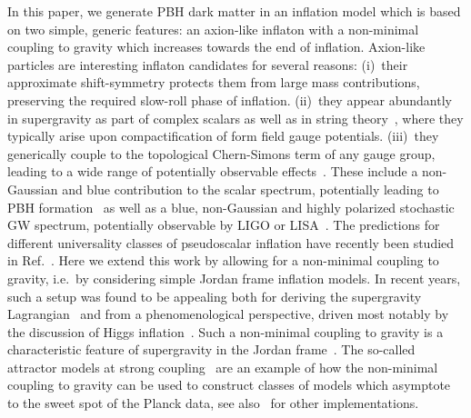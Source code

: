 In this paper, we generate PBH dark matter in an inflation model which is based on two simple, generic features: an axion-like inflaton with a non-minimal coupling to gravity which increases towards the end of inflation. Axion-like particles are interesting inflaton candidates for several reasons: (i)~their approximate shift-symmetry protects them from large mass contributions, preserving the required slow-roll phase of inflation. (ii)~they appear abundantly in supergravity as part of complex scalars as well as in string theory~\cite{0605206}, where they typically arise upon compactification of form field gauge potentials. (iii)~they generically couple to the topological Chern-Simons term of any gauge group, leading to a wide range of potentially observable effects~\cite{Turner:1987bw, Garretson:1992vt, Anber:2006xt,Barnaby:2011qe}. These include a non-Gaussian and blue contribution to the scalar spectrum, potentially leading to PBH formation~\cite{Barnaby:2010vf,Linde:2012bt,Lin:2012gs,Meerburg:2012id,Bugaev:2013fya,Garcia-Bellido:2016dkw} as well as a blue, non-Gaussian and highly polarized stochastic GW spectrum, potentially observable by LIGO or LISA~\cite{Cook:2011hg,Anber:2012du,Bartolo:2016ami}.
%
The predictions for different universality classes of pseudoscalar inflation have recently been studied in Ref.~\cite{Domcke:2016bkh}. Here we extend this work by allowing for a non-minimal coupling to gravity, i.e.\ by considering simple Jordan frame inflation models. In recent years, such a setup was found to be appealing both for deriving the supergravity Lagrangian~\cite{Kallosh:2000ve} and from a phenomenological perspective, driven most notably by the discussion of Higgs inflation~\cite{Bezrukov:2007ep}. Such a non-minimal coupling to gravity is a characteristic feature of supergravity in the Jordan frame~\cite{Kallosh:2013hoa,Kallosh:2013tua,Ferrara:2013rsa,Galante:2014ifa,Broy:2015qna,Das:2016kwz}. The so-called attractor models at strong coupling~\cite{Kallosh:2013tua,Kallosh:2013yoa} are an example of how the non-minimal coupling to gravity can be used to construct classes of models which asymptote to the sweet spot of the Planck data, see also~\cite{Einhorn:2009bh,Ferrara:2010yw,Buchmuller:2013zfa,Giudice:2014toa,Pallis:2013yda,Pallis:2014dma,Pallis:2014boa,Ellis:2013xoa,Kallosh:2013xya,Nakayama:2010ga,Pieroni:2015cma} for other implementations.


